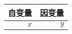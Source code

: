 \documentclass[nofonts]{ctexart}
\begin{document}
\begin{tabular}{r|r}
	自变量	& 因变量\footnotemark	\\
	\hline
	$x$	& $y$
\end{tabular}
\end{document}
